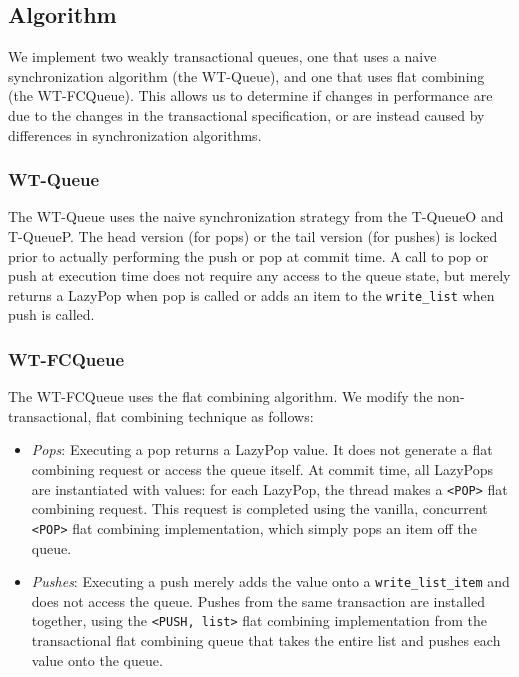 \subsection{Algorithm}

We implement two weakly transactional queues, one that uses a naive synchronization algorithm (the WT-Queue), and one that uses flat combining (the WT-FCQueue). This allows us to determine if changes in performance are due to the changes in the transactional specification, or are instead caused by differences in synchronization algorithms.

\subsubsection{WT-Queue}
The WT-Queue uses the naive synchronization strategy from the T-QueueO and T-QueueP. The head version (for pops) or the tail version (for pushes) is locked prior to actually performing the push or pop at commit time. A call to pop or push at execution time does not require any access to the queue state, but merely returns a LazyPop when pop is called or adds an item to the \texttt{write\_list} when push is called.

\subsubsection{WT-FCQueue}
The WT-FCQueue uses the flat combining algorithm. We modify the non-transactional, flat combining technique as follows:
\begin{itemize}
    \item \emph{Pops}: 
    Executing a pop returns a LazyPop value. It does not generate a flat combining request or access the queue itself. At commit time, all LazyPops are instantiated with values: for each LazyPop, the thread makes a \texttt{<POP>} flat combining request. This request is completed using the vanilla, concurrent \texttt{<POP>} flat combining implementation, which simply pops an item off the queue.

    \item \emph{Pushes}: 
    Executing a push merely adds the value onto a \texttt{write\_list\_item} and does not access the queue. Pushes from the same transaction are installed together, using the \texttt{<PUSH, list>} flat combining implementation from the transactional flat combining queue that takes the entire list and pushes each value onto the queue.
\end{itemize}


